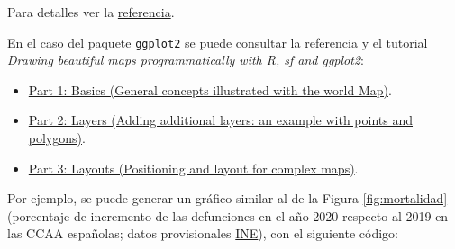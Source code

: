\documentclass[
  spanish,
]{book}
\providecommand{\tightlist}{%
  \setlength{\itemsep}{0pt}\setlength{\parskip}{0pt}}
\theoremstyle{break}
\theoremstyle{definition}
\theoremstyle{definition}
\theoremstyle{definition}
\theoremstyle{definition}
\theoremstyle{remark}
\begin{document}
Para detalles ver la \href{https://r-spatial.github.io/sf/reference/tidyverse.html}{referencia}.

En el caso del paquete \href{https://ggplot2.tidyverse.org}{\texttt{ggplot2}} se puede consultar la \href{https://ggplot2.tidyverse.org/reference/ggsf.html}{referencia} y el tutorial \emph{Drawing beautiful maps programmatically with R, sf and ggplot2}:

\begin{itemize}
\tightlist
\item
  \href{https://r-spatial.org/r/2018/10/25/ggplot2-sf.html}{Part 1: Basics (General concepts illustrated with the world Map)}.
\item
  \href{https://r-spatial.org/r/2018/10/25/ggplot2-sf-2.html}{Part 2: Layers (Adding additional layers: an example with points and polygons)}.
\item
  \href{https://r-spatial.org/r/2018/10/25/ggplot2-sf-3.html}{Part 3: Layouts (Positioning and layout for complex maps)}.
\end{itemize}

Por ejemplo, se puede generar un gráfico similar al de la Figura \ref{fig:mortalidad} (porcentaje de incremento de las defunciones en el año 2020 respecto al 2019 en las CCAA españolas; datos provisionales \href{https://www.ine.es/jaxi/Tabla.htm?tpx=21856\&L=0}{INE}), con el siguiente código:
\end{document}
